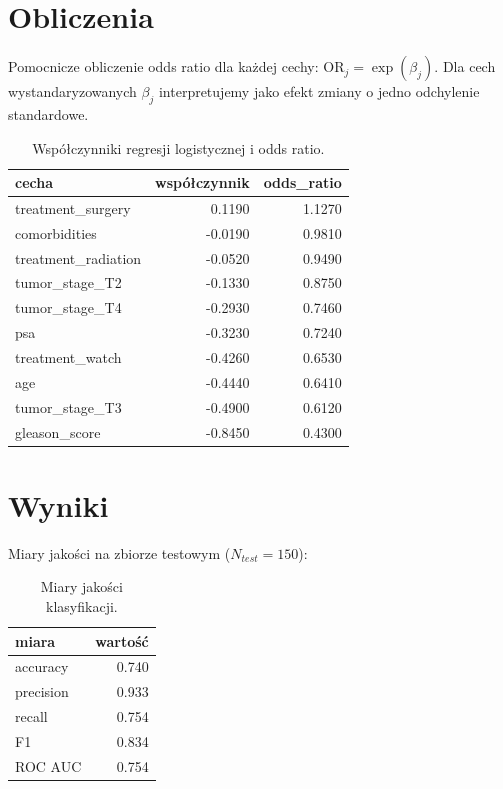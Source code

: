 \documentclass[12pt,a4paper]{article}
\begin{document}
\section{Obliczenia}
Pomocnicze obliczenie odds ratio dla każdej cechy: $\text{OR}_j = \exp(\beta_j)$. Dla cech wystandaryzowanych $\beta_j$ interpretujemy jako efekt zmiany o jedno odchylenie standardowe.

\begin{table}[H]
\centering
\begin{tabular}{lrr}
\toprule
cecha & współczynnik & odds\_ratio \\
\midrule
treatment\_surgery & 0.1190 & 1.1270 \\
comorbidities & -0.0190 & 0.9810 \\
treatment\_radiation & -0.0520 & 0.9490 \\
tumor\_stage\_T2 & -0.1330 & 0.8750 \\
tumor\_stage\_T4 & -0.2930 & 0.7460 \\
psa & -0.3230 & 0.7240 \\
treatment\_watch & -0.4260 & 0.6530 \\
age & -0.4440 & 0.6410 \\
tumor\_stage\_T3 & -0.4900 & 0.6120 \\
gleason\_score & -0.8450 & 0.4300 \\
\bottomrule
\end{tabular}

\caption{Współczynniki regresji logistycznej i odds ratio.}
\label{tab:coef}
\end{table}


\section{Wyniki}
Miary jakości na zbiorze testowym ($N_{test}=150$):

\begin{table}[H]
\centering
\begin{tabular}{lr}
\toprule
miara & wartość \\
\midrule
accuracy & 0.740 \\
precision & 0.933 \\
recall & 0.754 \\
F1 & 0.834 \\
ROC AUC & 0.754 \\
\bottomrule
\end{tabular}

\caption{Miary jakości klasyfikacji.}
\label{tab:metrics}
\end{table}
\end{document}
